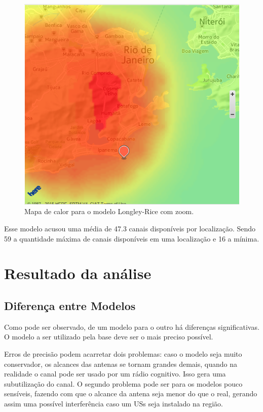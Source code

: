 \begin{figure}[htb]
\centering
\includegraphics[width=1.0\textwidth]{figs/longleyricein}
\caption[Mapa de calor para o modelo Longley-Rice com zoom.]
{Mapa de calor para o modelo Longley-Rice com zoom.}
\label{fig:longleyricein}
\end{figure} 

\FloatBarrier

Esse modelo acusou uma média de 47.3 canais disponíveis por localização. Sendo 59 a quantidade máxima de canais disponíveis em uma localização e 16 a mínima.

\section{Resultado da análise}

\subsection{Diferença entre Modelos}

Como pode ser observado, de um modelo para o outro há diferenças significativas. O modelo a ser utilizado pela base deve ser o mais preciso possível.

Erros de precisão podem acarretar dois problemas: caso o modelo seja muito conservador, os alcances das antenas se tornam grandes demais, quando na realidade o canal pode ser usado por um rádio cognitivo. Isso gera uma subutilização do canal. O segundo problema pode ser para os modelos pouco sensíveis, fazendo com que o alcance da antena seja menor do que o real, gerando assim uma possível interferência caso um USs seja instalado na região.


